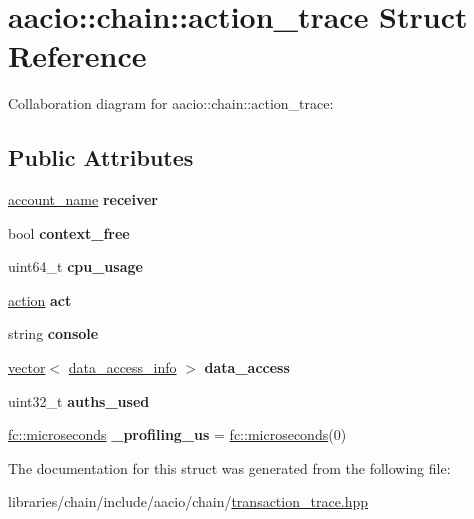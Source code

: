 \hypertarget{structaacio_1_1chain_1_1action__trace}{}\section{aacio\+:\+:chain\+:\+:action\+\_\+trace Struct Reference}
\label{structaacio_1_1chain_1_1action__trace}


Collaboration diagram for aacio\+:\+:chain\+:\+:action\+\_\+trace\+:
\subsection*{Public Attributes}
\begin{DoxyCompactItemize}
\item 
\mbox{\label{structaacio_1_1chain_1_1action__trace_aa91a669942c761c57977a040c2659b44}} 
\mbox{\hyperlink{structaacio_1_1chain_1_1name}{account\+\_\+name}} {\bfseries receiver}
\item 
\mbox{\label{structaacio_1_1chain_1_1action__trace_a4c560e258af78fe72d2aeb16fcdbe6da}} 
bool {\bfseries context\+\_\+free}
\item 
\mbox{\label{structaacio_1_1chain_1_1action__trace_ad80037844a74829709f3f0d7ef232af6}} 
uint64\+\_\+t {\bfseries cpu\+\_\+usage}
\item 
\mbox{\label{structaacio_1_1chain_1_1action__trace_a9817519eee11fcc7146194db104a0cfd}} 
\mbox{\hyperlink{structaacio_1_1chain_1_1action}{action}} {\bfseries act}
\item 
\mbox{\label{structaacio_1_1chain_1_1action__trace_a96d983f6d833a12cf7084f4fab27d556}} 
string {\bfseries console}
\item 
\mbox{\label{structaacio_1_1chain_1_1action__trace_ab0b4ff9c56a9c3397ea9bb89d6041921}} 
\mbox{\hyperlink{classstd_1_1vector}{vector}}$<$ \mbox{\hyperlink{structaacio_1_1chain_1_1data__access__info}{data\+\_\+access\+\_\+info}} $>$ {\bfseries data\+\_\+access}
\item 
\mbox{\label{structaacio_1_1chain_1_1action__trace_aaf39ca03d2d2c3ee001a3900fa97871a}} 
uint32\+\_\+t {\bfseries auths\+\_\+used}
\item 
\mbox{\label{structaacio_1_1chain_1_1action__trace_aa5187bc53ba50cae8dc2155d0c47a663}} 
\mbox{\hyperlink{classfc_1_1microseconds}{fc\+::microseconds}} {\bfseries \+\_\+profiling\+\_\+us} = \mbox{\hyperlink{classfc_1_1microseconds}{fc\+::microseconds}}(0)
\end{DoxyCompactItemize}


The documentation for this struct was generated from the following file\+:\begin{DoxyCompactItemize}
\item 
libraries/chain/include/aacio/chain/\mbox{\hyperlink{transaction__trace_8hpp}{transaction\+\_\+trace.\+hpp}}\end{DoxyCompactItemize}

